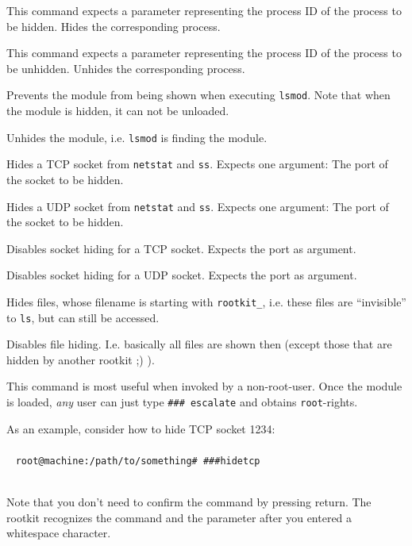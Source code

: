 \documentclass[10pt, letterpaper]{article}
\begin{document}
\begin{description}[font=\ttfamily]
\item[hideproc] This command expects a parameter representing the process ID of the process to be hidden. Hides the corresponding process. 
\item[unhideproc] This command expects a parameter representing the process ID of the process to be unhidden. Unhides the corresponding process. 
\item[hidemodule] Prevents the module from being shown when executing \texttt{lsmod}. Note that when the module is hidden, it can not be unloaded.
\item[unhidemodule] Unhides the module, i.e. \texttt{lsmod} is finding the module.
\item[hidetcp] Hides a TCP socket from \texttt{netstat} and \texttt{ss}. Expects one argument: The port of the socket to be hidden.
\item[hideudp] Hides a UDP socket from \texttt{netstat} and \texttt{ss}. Expects one argument: The port of the socket to be hidden. 
\item[unhidetcp] Disables socket hiding for a TCP socket. Expects the port as argument.
\item[unhideudp] Disables socket hiding for a UDP socket. Expects the port as argument. 
\item[hidefiles] Hides files, whose filename is starting with \texttt{rootkit\_}, i.e. these files are ``invisible'' to \texttt{ls}, but can still be accessed. 
\item[unhidefiles] Disables file hiding. I.e. basically all files are shown then (except those that are hidden by another rootkit ;) ).
\item[escalate] This command is most useful when invoked by a non-root-user. Once the module is loaded, \emph{any} user can just type \texttt{\#\#\# escalate} and obtains \texttt{root}-rights.
\end{description}

As an example, consider how to hide TCP socket 1234:
\\~
\\~
\texttt{root@machine:/path/to/something\# \#\#\#\textvisiblespace hidetcp\textvisiblespace}\\~

Note that you don't need to confirm the command by pressing return. The rootkit recognizes the command and the parameter after you entered a whitespace character.
\end{document}
